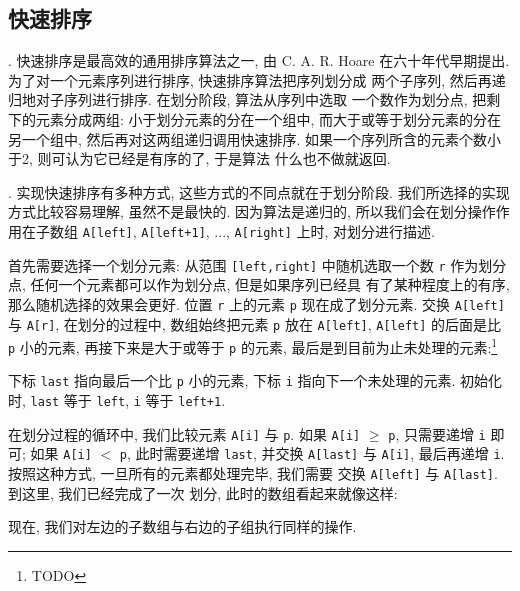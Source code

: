 \subsection{快速排序}
\label{subsec:quicksort}

. 快速排序是最高效的通用排序算法之一, 由 C. A. R. Hoare
在六十年代早期提出. 为了对一个元素序列进行排序, 快速排序算法把序列划分成
两个子序列, 然后再递归地对子序列进行排序. 在划分阶段, 算法从序列中选取
一个数作为划分点, 把剩下的元素分成两组: 小于划分元素的分在一个组中, 
而大于或等于划分元素的分在另一个组中, 然后再对这两组递归调用快速排序.
如果一个序列所含的元素个数小于2, 则可认为它已经是有序的了, 于是算法
什么也不做就返回.

. 实现快速排序有多种方式, 这些方式的不同点就在于划分阶段.
我们所选择的实现方式比较容易理解, 虽然不是最快的. 因为算法是递归的,
所以我们会在划分操作作用在子数组 \texttt{A[left]}, \texttt{A[left+1]},
..., \texttt{A[right]} 上时, 对划分进行描述.

首先需要选择一个划分元素: 从范围 \texttt{[left,right]} 中随机选取一个数
\texttt{r} 作为划分点, 任何一个元素都可以作为划分点, 但是如果序列已经具
有了某种程度上的有序, 那么随机选择的效果会更好. 位置 \texttt{r} 上的元素
\texttt{p} 现在成了划分元素. 交换 \texttt{A[left]} 与 \texttt{A[r]},
在划分的过程中, 数组始终把元素 \texttt{p} 放在 \texttt{A[left]}, 
\texttt{A[left]} 的后面是比 \texttt{p} 小的元素, 再接下来是大于或等于
\texttt{p} 的元素, 最后是到目前为止未处理的元素:\footnote{TODO}

下标 \texttt{last} 指向最后一个比 \texttt{p} 小的元素, 下标 \texttt{i}
指向下一个未处理的元素. 初始化时, \texttt{last} 等于 \texttt{left},
\texttt{i} 等于 \texttt{left+1}.

在划分过程的循环中, 我们比较元素 \texttt{A[i]} 与 \texttt{p}. 如果 
\texttt{A[i]} $\geqslant$ \texttt{p}, 只需要递增 \texttt{i} 即可; 如果
\texttt{A[i]} $<$ \texttt{p},
此时需要递增 \texttt{last}, 并交换 \texttt{A[last]} 与 \texttt{A[i]},
最后再递增 \texttt{i}. 按照这种方式, 一旦所有的元素都处理完毕, 我们需要
交换 \texttt{A[left]} 与 \texttt{A[last]}. 到这里, 我们已经完成了一次
划分, 此时的数组看起来就像这样:
\begin{center}
\end{center}
现在, 我们对左边的子数组与右边的子组执行同样的操作.

